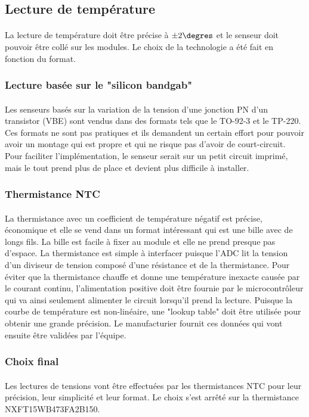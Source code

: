 

\subsection{Lecture de température}
	\paragraph*{}
	La lecture de température doit être précise à $\pm 2\degres$ et le senseur doit pouvoir être collé sur les modules. Le choix de la technologie a été fait en fonction du format. 
	
	\subsubsection*{Lecture basée sur le "silicon bandgab"}
	\paragraph*{}
	Les senseurs basés sur la variation de la tension d'une jonction PN d'un transistor (VBE) sont vendus dans des formats tels que le TO-92-3 et le TP-220. Ces formats ne sont pas pratiques et ils demandent un certain effort pour pouvoir avoir un montage qui est propre et qui ne risque pas d'avoir de court-circuit. Pour faciliter l'implémentation, le senseur serait sur un petit circuit imprimé, mais le tout prend plus de place et devient plus difficile à installer.
	
	\subsubsection*{Thermistance NTC}
	\paragraph*{}
	La thermistance avec un coefficient de température négatif est précise, économique et elle se vend dans un format intéressant qui est une bille avec de longs fils. La bille est facile à fixer au module et elle ne prend presque pas d'espace. La thermistance est simple à interfacer puisque l'ADC lit la tension d'un diviseur de tension composé d'une résistance et de la thermistance. Pour éviter que la thermistance chauffe et donne une température inexacte causée par le courant continu, l'alimentation positive doit être fournie par le microcontrôleur qui va ainsi seulement alimenter le circuit lorsqu'il prend la lecture. Puisque la courbe de température est non-linéaire, une "lookup table" doit être utilisée pour obtenir une grande précision. Le manufacturier fournit ces données qui vont ensuite être validées par l'équipe.  
	
	\subsubsection*{Choix final}
	\paragraph*{}
	Les lectures de tensions vont être effectuées par les thermistances NTC pour leur précision, leur simplicité et leur format. Le choix s'est arrêté sur la thermistance NXFT15WB473FA2B150.